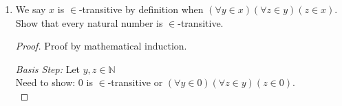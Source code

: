 \documentclass{article}
\newcommand{\naturals}{\mathbb{N}}
\newcommand{\s}{\mathbb{S}}
\newenvironment{case}[1][Case]
    {\par\textit{#1:}\hfill\break}
    {}
\begin{document}
\begin{enumerate}
\begin{proof}
\begin{multicols}{2}
\begin{case}[Inductive Step]
\begin{align*}
          \\
        &=2^{\s(n)}+0+2^{\s(n)}
        &\quad
        &\text{By $+$ Rule 1}
          \\
        &=2^{\s(n)}+(2^{\s(n)}\cdot0)+2^{\s(n)}
        &\quad
        &\text{By $\cdot$ Rule 1}
          \\
        &=2^{\s(n)}+(2^{\s(n)}\cdot\s(0))
        &\quad
        &\text{By $\cdot$ Rule 2}
          \\
        &=2^{\s(n)}+(2^{\s(n)}\cdot1)
        &\quad
        &\text{By Def of }\s(n)
          \\
        &=(2^{\s(n)}\cdot1)+2^{\s(n)}
        &\quad
        &\text{By Comm.}
          \\
        &=(2^{\s(n)}\cdot\s(1))
        &\quad
        &\text{By $\cdot$ Rule 2}
          \\
        &=2^{\s(n)}\cdot2
        &\quad
        &\text{By Def of }\s(n)
          \\
        &=2\cdot2^{\s(n)}
        &\quad
        &\text{By Comm.}
          \\
        &=2^{\s(\s(n))}
        &\quad
        &\text{By $n^m$ Rule 2}
          \\
        &=2^{\s(n)+1}
        &\quad
        &\text{By Def of }\s(n)
    \end{align*}
    \end{case}
    \end{multicols}
    Therefore by mathematical induction, we can conclude $1+\sum_{i = 0}^{n} 2^i = 2^{n + 1}$.\\
    \end{proof}
\restoregeometry  
  \item We say $x$ is $\in$-transitive by definition when $(\forall y \in x)(\forall z \in y)(z \in x)$. 
    Show that every natural number is $\in$-transitive.
    \begin{proof}
    Proof by mathematical induction.
    \begin{case}[Basis Step]
        Let $y,z \in \naturals$\\
        Need to show: 0 is $\in$-transitive or $(\forall y \in 0)(\forall z \in y)(z \in 0)$.\\


\end{case}
\end{proof}
\end{enumerate}
\end{document}
